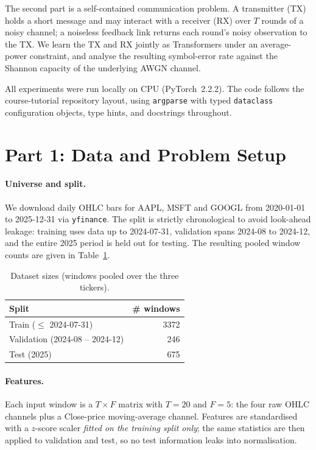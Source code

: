 \documentclass[10pt,twocolumn]{article}
\begin{document}
The second part is a self-contained communication problem. A transmitter (TX)
holds a short message and may interact with a receiver (RX) over $T$ rounds of a
noisy channel; a noiseless feedback link returns each round's noisy observation
to the TX. We learn the TX and RX jointly as Transformers under an average-power
constraint, and analyse the resulting symbol-error rate against the
Shannon capacity of the underlying AWGN channel.

All experiments were run locally on CPU (PyTorch~2.2.2). The code follows the
course-tutorial repository layout, using \texttt{argparse} with typed
\texttt{dataclass} configuration objects, type hints, and docstrings throughout.

\section{Part 1: Data and Problem Setup}
\paragraph{Universe and split.} We download daily OHLC bars for AAPL, MSFT and
GOOGL from 2020-01-01 to 2025-12-31 via \texttt{yfinance}. The split is strictly
chronological to avoid look-ahead leakage: training uses data up to 2024-07-31,
validation spans 2024-08 to 2024-12, and the entire 2025 period is held out for
testing. The resulting pooled window counts are given in Table~\ref{tab:data}.

\begin{table}[t]
\centering
\caption{Dataset sizes (windows pooled over the three tickers).}
\label{tab:data}
\begin{tabular}{lr}
\toprule
Split & \# windows \\
\midrule
Train ($\le$ 2024-07-31)      & 3372 \\
Validation (2024-08 -- 2024-12) & 246 \\
Test (2025)                    & 675 \\
\bottomrule
\end{tabular}
\end{table}

\paragraph{Features.} Each input window is a $T\times F$ matrix with $T{=}20$ and
$F{=}5$: the four raw OHLC channels plus a Close-price moving-average channel.
Features are standardised with a $z$-score scaler \emph{fitted on the training
split only}; the same statistics are then applied to validation and test, so no
test information leaks into normalisation.
\end{document}
